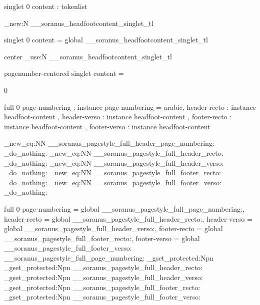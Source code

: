 %

 { singlet } { 0 }
  {
    content : tokenlist
  }


\tl_new:N \g__soranus_headfootcontent_singlet_tl

 { singlet } { 0 }
  {
    content = global \g__soranus_headfootcontent_singlet_tl
  }
  {
    \AssignTemplateKeys
    \parbox [ t ] { \textwidth }
      {
         { center }
        \tl_use:N \g__soranus_headfootcontent_singlet_tl
        \strut
      }
  }


%

 { pagenumber-centered } { singlet }
  {
    content = \thepage
  }



%

 { 0 }


%

 { full } { 0 }
  {
    page-numbering : instance { page-numbering } = arabic,
    header-recto   : instance { headfoot-content },
    header-verso   : instance { headfoot-content },
    footer-recto   : instance { headfoot-content },
    footer-verso   : instance { headfoot-content }
  }


\cs_new_eq:NN \__soranus_pagestyle_full_header_page_numbering: \prg_do_nothing:
\cs_new_eq:NN \__soranus_pagestyle_full_header_recto: \prg_do_nothing:
\cs_new_eq:NN \__soranus_pagestyle_full_header_verso: \prg_do_nothing:
\cs_new_eq:NN \__soranus_pagestyle_full_footer_recto: \prg_do_nothing:
\cs_new_eq:NN \__soranus_pagestyle_full_footer_verso: \prg_do_nothing:

 { full } { 0 }
  {
    page-numbering = global \__soranus_pagestyle_full_page_numbering:,
    header-recto   = global \__soranus_pagestyle_full_header_recto:,
    header-verso   = global \__soranus_pagestyle_full_header_verso:,
    footer-recto   = global \__soranus_pagestyle_full_footer_recto:,
    footer-verso   = global \__soranus_pagestyle_full_footer_verso:
  }
  {
    \AssignTemplateKeys
    \__soranus_pagestyle_full_page_numbering:
    \cs_gset_protected:Npn \@mkboth { \markboth }
    \cs_gset_protected:Npn \@oddhead
      { \__soranus_pagestyle_full_header_recto: }
    \cs_gset_protected:Npn \@evenhead
      { \__soranus_pagestyle_full_header_verso: }
    \cs_gset_protected:Npn \@oddfoot
      { \__soranus_pagestyle_full_footer_recto: }
    \cs_gset_protected:Npn \@evenfoot
      { \__soranus_pagestyle_full_footer_verso: }
  }


